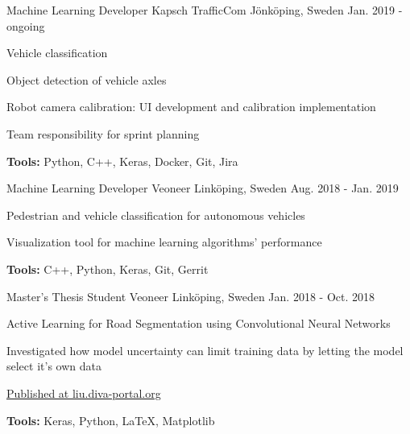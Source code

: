 

\begin{cventries}

  \cventry
    {Machine Learning Developer} %
    {Kapsch TrafficCom} %
    {Jönköping, Sweden} %
    {Jan. 2019 - ongoing} %
    {
      \begin{cvitems} %
        \item {Vehicle classification}
        \item {Object detection of vehicle axles}
        \item {Robot camera calibration: UI development and calibration implementation}
        \item {Team responsibility for sprint planning}
        \item {\textbf{Tools:} Python, C++, Keras, Docker, Git, Jira}
      \end{cvitems}
    }

  \cventry
    {Machine Learning Developer} %
    {Veoneer} %
    {Linköping, Sweden} %
    {Aug. 2018 - Jan. 2019} %
    {
      \begin{cvitems} %
        \item {Pedestrian and vehicle classification for autonomous vehicles}
        \item {Visualization tool for machine learning algorithms' performance}
        \item {\textbf{Tools:} C++, Python, Keras, Git, Gerrit}
      \end{cvitems}
    }

  \cventry
    {Master's Thesis Student} %
    {Veoneer} %
    {Linköping, Sweden} %
    {Jan. 2018 - Oct. 2018} %
    {
      \begin{cvitems} %
        \item {Active Learning for Road Segmentation using Convolutional Neural Networks}
        \item {Investigated how model uncertainty can limit training data by letting the model select it's own data}
        \item {\href{https://liu.diva-portal.org/smash/get/diva2:1259079/FULLTEXT01.pdf}{Published at liu.diva-portal.org}}
        \item {\textbf{Tools:} Keras, Python, LaTeX, Matplotlib}
      \end{cvitems}
    }


\end{cventries}
